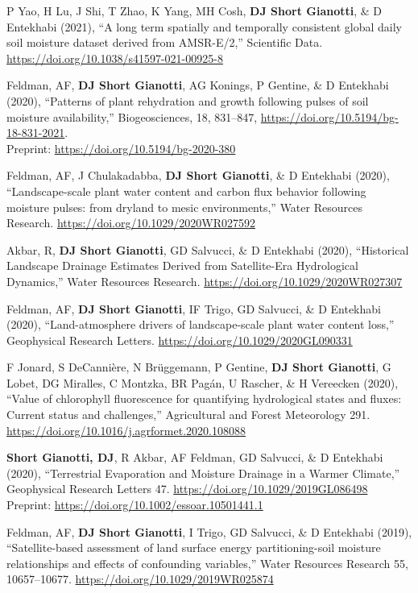 \documentclass[10pt, a4paper]{article}
\newcommand{\lbr}{\vspace*{12pt}}
\newcommand{\years}[1]{\mbox{}\marginnote{\scriptsize #1}} %
\begin{document}
\years{2021b}P Yao, H Lu, J Shi, T Zhao, K Yang, MH Cosh, \textbf{DJ Short Gianotti}, \& D Entekhabi (2021), ``A long term spatially and temporally consistent global daily soil moisture dataset derived from AMSR-E/2,'' Scientific Data. \url{https://doi.org/10.1038/s41597-021-00925-8} \lbr

\years{2021a}Feldman, AF, \textbf{DJ Short Gianotti}, AG Konings, P Gentine, \& D Entekhabi (2020), ``Patterns of plant rehydration and growth following pulses of soil moisture availability,'' Biogeosciences, 18, 831–847, \url{https://doi.org/10.5194/bg-18-831-2021}. \\Preprint: \url{https://doi.org/10.5194/bg-2020-380}\lbr

\years{2020e}Feldman, AF, J Chulakadabba, \textbf{DJ Short Gianotti}, \& D Entekhabi (2020), ``Landscape-scale plant water content and carbon flux behavior following moisture pulses: from dryland to mesic environments,'' Water Resources Research. \url{https://doi.org/10.1029/2020WR027592}\lbr

\years{2020d}Akbar, R, \textbf{DJ Short Gianotti}, GD Salvucci, \& D Entekhabi (2020), ``Historical Landscape Drainage Estimates Derived from Satellite-Era Hydrological Dynamics,'' Water Resources Research. \url{https://doi.org/10.1029/2020WR027307}\lbr

\years{2020c}Feldman, AF, \textbf{DJ Short Gianotti}, IF Trigo, GD Salvucci, \& D Entekhabi (2020), ``Land-atmosphere drivers of landscape-scale plant water content loss,'' Geophysical Research Letters. \url{https://doi.org/10.1029/2020GL090331}\lbr

\years{2020b}F Jonard, S DeCanni\`ere, N Br\"uggemann, P Gentine, \textbf{DJ Short Gianotti}, G Lobet, DG Miralles, C Montzka, BR Pag\'an, U Rascher, \& H Vereecken (2020), ``Value of chlorophyll fluorescence for quantifying hydrological states and fluxes: Current status and challenges,'' Agricultural and Forest Meteorology 291. \url{https://doi.org/10.1016/j.agrformet.2020.108088} \lbr

\years{2020a}\textbf{Short Gianotti, DJ}, R Akbar, AF Feldman, GD Salvucci, \& D Entekhabi (2020), ``Terrestrial Evaporation and Moisture Drainage in a Warmer Climate,'' Geophysical Research Letters 47. \url{https://doi.org/10.1029/2019GL086498}\\ Preprint: \url{https://doi.org/10.1002/essoar.10501441.1}\lbr

\years{2019d}Feldman, AF, \textbf{DJ Short Gianotti}, I Trigo, GD Salvucci, \& D Entekhabi (2019), ``Satellite-based assessment of land surface energy partitioning-soil moisture relationships and effects of confounding variables,'' Water Resources Research 55, 10657--10677. \url{https://doi.org/10.1029/2019WR025874} \lbr
\end{document}
